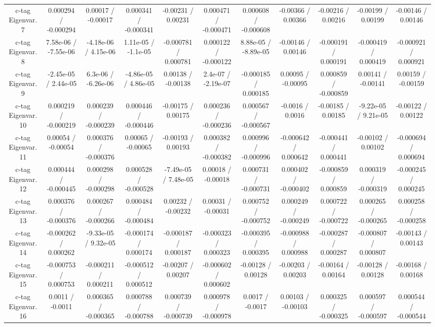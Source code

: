 \begin{table}[htbp]
\begin{center}
\begin{tabular}{|c|c|c|c|c|c|c|c|c|c|c|}
  c-tag Eigenvar. 7 & 0.000294 / -0.000294 & 0.00017 / -0.00017 & 0.000341 / -0.000341 & -0.00231 / 0.00231 & 0.000471 / -0.000471 & 0.000608 / -0.000608 & -0.00366 / 0.00366 & -0.00216 / 0.00216 & -0.00199 / 0.00199 & -0.00146 / 0.00146 \\ 
  c-tag Eigenvar. 8 & 7.58e-06 / -7.55e-06 & -4.18e-06 / 4.15e-06 & 1.11e-05 / -1.1e-05 & -0.000781 / 0.000781 & 0.000122 / -0.000122 & 8.88e-05 / -8.89e-05 & -0.00146 / 0.00146 & -0.000191 / 0.000191 & -0.000419 / 0.000419 & -0.000921 / 0.000921 \\ 
  c-tag Eigenvar. 9 & -2.45e-05 / 2.44e-05 & 6.3e-06 / -6.26e-06 & -4.86e-05 / 4.86e-05 & 0.00138 / -0.00138 & 2.4e-07 / -2.19e-07 & -0.000185 / 0.000185 & 0.00095 / -0.00095 & 0.000859 / -0.000859 & 0.00141 / -0.00141 & 0.00159 / -0.00159 \\ 
  c-tag Eigenvar. 10 & 0.000219 / -0.000219 & 0.000239 / -0.000239 & 0.000446 / -0.000446 & -0.00175 / 0.00175 & 0.000236 / -0.000236 & 0.000567 / -0.000567 & -0.0016 / 0.0016 & -0.00185 / 0.00185 & -9.22e-05 / 9.21e-05 & -0.00122 / 0.00122 \\ 
  c-tag Eigenvar. 11 & 0.00054 / -0.00054 & 0.000376 / -0.000376 & 0.00065 / -0.00065 & -0.00193 / 0.00193 & 0.000382 / -0.000382 & 0.000996 / -0.000996 & -0.000642 / 0.000642 & -0.000441 / 0.000441 & -0.00102 / 0.00102 & -0.000694 / 0.000694 \\ 
  c-tag Eigenvar. 12 & 0.000444 / -0.000445 & 0.000298 / -0.000298 & 0.000528 / -0.000528 & -7.49e-05 / 7.48e-05 & 0.00018 / -0.00018 & 0.000731 / -0.000731 & 0.000402 / -0.000402 & -0.000859 / 0.000859 & 0.000319 / -0.000319 & -0.000245 / 0.000245 \\ 
  c-tag Eigenvar. 13 & 0.000376 / -0.000376 & 0.000267 / -0.000266 & 0.000484 / -0.000484 & 0.00232 / -0.00232 & 0.00031 / -0.00031 & 0.000752 / -0.000752 & 0.000249 / -0.000249 & 0.000722 / -0.000722 & 0.000265 / -0.000265 & 0.000258 / -0.000258 \\ 
  c-tag Eigenvar. 14 & -0.000262 / 0.000262 & -9.33e-05 / 9.32e-05 & -0.000174 / 0.000174 & -0.000187 / 0.000187 & -0.000323 / 0.000323 & -0.000395 / 0.000395 & -0.000988 / 0.000988 & -0.000287 / 0.000287 & -0.000807 / 0.000807 & -0.00143 / 0.00143 \\ 
  c-tag Eigenvar. 15 & -0.000753 / 0.000753 & -0.000211 / 0.000211 & -0.000512 / 0.000512 & -0.00207 / 0.00207 & -0.000602 / 0.000602 & -0.00128 / 0.00128 & -0.00203 / 0.00203 & -0.00164 / 0.00164 & -0.00128 / 0.00128 & -0.00168 / 0.00168 \\ 
  c-tag Eigenvar. 16 & 0.0011 / -0.0011 & 0.000365 / -0.000365 & 0.000788 / -0.000788 & 0.000739 / -0.000739 & 0.000978 / -0.000978 & 0.0017 / -0.0017 & 0.00103 / -0.00103 & 0.000325 / -0.000325 & 0.000597 / -0.000597 & 0.000544 / -0.000544 \\ 

\end{tabular}
\end{center}
\end{table}
